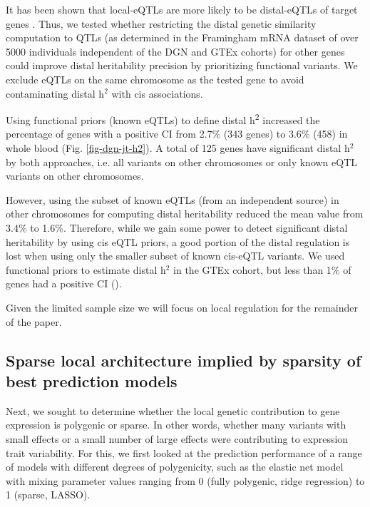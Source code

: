 \documentclass[10pt,letterpaper]{article}
\begin{document}
It has been shown that local-eQTLs are more likely to be distal-eQTLs of target genes \cite{pierce2014mediation}. Thus, we tested whether restricting the distal genetic similarity computation to QTLs (as determined in the Framingham mRNA dataset of over 5000 individuals \cite{Zhang_2015}  independent of the DGN and GTEx cohorts) for other genes could improve distal heritability precision by prioritizing functional variants. We exclude eQTLs on the same chromosome as the tested gene to avoid contaminating distal h$^2$ with cis associations. 

Using functional priors (known eQTLs) to define distal h\textsuperscript{2} increased the percentage of genes with a positive CI from 2.7\% (343 genes) to 3.6\% (458) in whole blood (Fig. \ref{fig-dgn-jt-h2}). A total of 125 genes have significant distal h$^2$ by both approaches, i.e. all variants on other chromosomes or only  known eQTL variants on other chromosomes.

However, using the subset of known eQTLs (from an independent source) in other chromosomes for computing distal heritability reduced the mean value from 3.4\% to 1.6\%. Therefore, while we gain some power to detect significant distal heritability by using cis eQTL priors, a good portion of the distal regulation is lost when using only the smaller subset of known cis-eQTL variants. We used functional priors to estimate distal h$^2$ in the GTEx cohort, but less than 1\% of genes had a positive CI ().

Given the limited sample size we will focus on local regulation for the remainder of the paper.

\subsection*{Sparse local architecture implied by sparsity of best prediction models }\label{the-effect-of-local-genetic-variation-on-gene-expression-is-sparse-rather-than-polygenic}

Next, we sought to determine whether the local genetic contribution to gene expression is polygenic or sparse. In other words, whether many variants with small effects or a small number of large effects were contributing to expression trait variability. For this, we first looked at the prediction performance of a range of models with different degrees of polygenicity, such as the elastic net model with  mixing parameter values ranging from 0 (fully polygenic, ridge regression) to 1 (sparse, LASSO).
\end{document}
